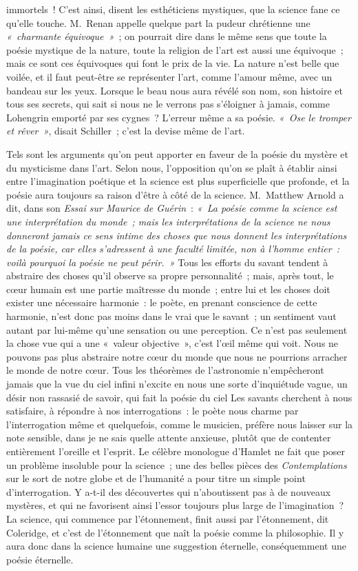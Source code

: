 \documentclass[french,twoside]{book} %
\begin{document}
immortels ! C’est ainsi, disent les esthéticiens mystiques, que la science fane ce qu’elle touche. M. Renan appelle quelque part la pudeur chrétienne une \emph{« charmante équivoque »} ; on pourrait dire dans le même sens que toute la poésie mystique de la nature, toute la religion de l’art est aussi une équivoque ; mais ce sont ces équivoques qui font le prix de la vie. La nature n’est belle que voilée, et il faut peut-être se représenter l’art, comme l’amour même, avec un bandeau sur les yeux. Lorsque le beau nous aura révélé son nom, son histoire et tous ses secrets, qui sait si nous ne le verrons pas s’éloigner à  jamais, comme Lohengrin emporté par ses cygnes ? L’erreur même a sa poésie. \emph{« Ose le tromper et rêver »}, disait Schiller ; c’est la devise même de l’art.\par
Tels sont les arguments qu’on peut apporter en faveur de la poésie du mystère et du mysticisme dans l’art. Selon nous, l’opposition qu’on se plaît à établir ainsi entre l’imagination poétique et la science est plus superficielle que profonde, et la poésie aura toujours sa raison d’être à côté de la science. M. Matthew Arnold a dit, dans son \emph{Essai sur Maurice de Guérin} : \emph{« La poésie comme la science est une interprétation du monde ; mais les interprétations de la science ne nous donneront jamais ce sens intime des choses que nous donnent les interprétations de la poésie, car elles s’adressent à une faculté limitée, non à l’homme entier : voilà pourquoi la poésie ne peut périr. »} Tous les efforts du savant tendent à abstraire des choses qu’il observe sa propre personnalité ; mais, après tout, le cœur humain est une partie maîtresse du monde ; entre lui et les choses doit exister une nécessaire harmonie : le poète, en prenant conscience de cette harmonie, n’est donc pas moins dans le vrai que le savant ; un sentiment vaut autant par lui-même qu’une sensation ou une perception. Ce n’est pas seulement la chose vue qui a une « valeur objective », c’est l’œil même qui voit. Nous ne pouvons pas plus abstraire notre cœur du monde que nous ne pourrions arracher le monde de notre cœur. Tous les théorèmes de l’astronomie n’empêcheront jamais que la vue du ciel infini n’excite en nous une sorte d’inquiétude vague, un désir non rassasié de savoir, qui fait la poésie du ciel Les  savants cherchent à nous satisfaire, à répondre à nos interrogations : le poète nous charme par l’interrogation même et quelquefois, comme le musicien, préfère nous laisser sur la note sensible, dans je ne sais quelle attente anxieuse, plutôt que de contenter entièrement l’oreille et l’esprit. Le célèbre monologue d’Hamlet ne fait que poser un problème insoluble pour la science ; une des belles pièces des \emph{Contemplations} sur le sort de notre globe et de l’humanité a pour titre un simple point d’interrogation. Y a-t-il des découvertes qui n’aboutissent pas à de nouveaux mystères, et qui ne favorisent ainsi l’essor toujours plus large de l’imagination ? La science, qui commence par l’étonnement, finit aussi par l’étonnement, dit Coleridge, et c’est de l’étonnement que naît la poésie comme la philosophie. Il y aura donc dans la science humaine une suggestion éternelle, conséquemment une poésie éternelle.\par
\end{document}
